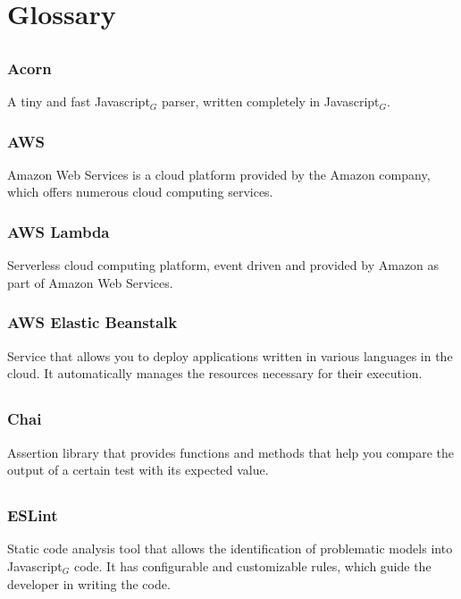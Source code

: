 \section{Glossary}
	\subsection*{}
		\subsubsection*{Acorn}
			A tiny and fast Javascript$_{G}$ parser, written completely in Javascript$_{G}$. 
		\subsubsection*{AWS}
			Amazon Web Services is a cloud platform provided by the Amazon company, which offers numerous cloud computing services.
		\subsubsection*{AWS Lambda}
			Serverless cloud computing platform, event driven and provided by Amazon as part of Amazon Web Services.
			
		\subsubsection*{AWS Elastic Beanstalk}
			Service that allows you to deploy applications written in various languages in the cloud. It automatically manages the resources necessary for their execution.
			
	\subsection*{}
		\subsubsection*{Chai}
			Assertion library that provides functions and methods that help you compare the output of a certain test with its expected value.
			
	\subsection*{}
		\subsubsection*{ESLint}
			Static code analysis tool that allows the identification of problematic models into Javascript$_{G}$ code. It has configurable and customizable rules, which guide the developer in writing the code.
